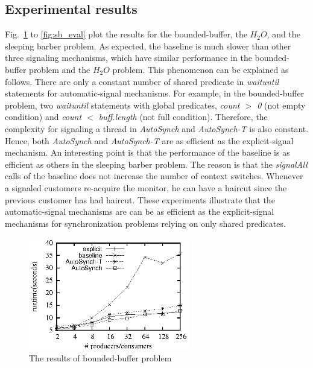 \documentclass[preprint]{sigplanconf}
\begin{document}
\subsection{Experimental results}


Fig.~\ref{fig:pc_eval} to \ref{fig:sb_eval} plot the results for the
bounded-buffer, the $H_2O$, and the sleeping barber problem. As expected, 
the baseline is much slower than other three signaling mechanisms, which have
similar performance in the bounded-buffer problem and the $H_2O$ problem. This 
phenomenon can be explained as follows. There are only a constant number of
shared predicate in {\em waituntil} statements for automatic-signal mechanisms.  
For example, in the bounded-buffer problem, two {\em waituntil} statements 
with global predicates, {\em count $>$ 0} (not empty condition) and {\em count
$<$ buff.length} (not full condition). Therefore, the 
complexity for signaling a thread in {\em AutoSynch} and {\em AutoSynch-T} is 
also constant. Hence, both {\em AutoSynch} and {\em AutoSynch-T} are as 
efficient as the explicit-signal mechanism. An interesting point is that the
performance of the baseline is as efficient as others in the sleeping barber
problem. The reason is that the {\em signalAll} calls of the baseline does not
increase the number of context switches. Whenever a signaled customers
re-acquire the monitor, he can have a haircut since the previous customer has
had haircut. These experiments illustrate that the automatic-signal mechanisms
are can be as efficient as the explicit-signal mechanisms for synchronization 
problems relying on only shared predicates. 

\begin{figure}[ht!]
  \centering
  \includegraphics[width=70mm]{fig/pc.eps}
  \caption{The results of bounded-buffer problem}
  \label{fig:pc_eval}
\end{figure}
\end{document}

